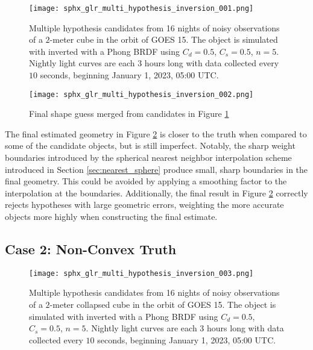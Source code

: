 \begin{figure}[!htb]
    \centering
    \texttt{[image: sphx\_glr\_multi\_hypothesis\_inversion\_001.png]}
    \caption{Multiple hypothesis candidates from 16 nights of noisy observations of a $2$-meter cube in the orbit of GOES 15. The object is simulated with inverted with a Phong BRDF using $C_d=0.5$, $C_s=0.5$, $n=5$. Nightly light curves are each $3$ hours long with data collected every $10$ seconds, beginning January 1, 2023, 05:00 UTC.}
    \label{fig:multi_hyp_candidates_cvx}
\end{figure}

\begin{figure}[!htb]
  \centering
  \texttt{[image: sphx\_glr\_multi\_hypothesis\_inversion\_002.png]}
  \caption{Final shape guess merged from candidates in Figure \ref{fig:multi_hyp_candidates_cvx}}
  \label{fig:multi_hyp_final_cvx}
\end{figure}

The final estimated geometry in Figure \ref{fig:multi_hyp_final_cvx} is closer to the truth when compared to some of the candidate objects, but is still imperfect. Notably, the sharp weight boundaries introduced by the spherical nearest neighbor interpolation scheme introduced in Section \ref{sec:nearest_sphere} produce small, sharp boundaries in the final geometry. This could be avoided by applying a smoothing factor to the interpolation at the boundaries. Additionally, the final result in Figure \ref{fig:multi_hyp_final_cvx} correctly rejects hypotheses with large geometric errors, weighting the more accurate objects more highly when constructing the final estimate.

\subsection{Case 2: Non-Convex Truth}

\begin{figure}[!htb]
  \centering
  \texttt{[image: sphx\_glr\_multi\_hypothesis\_inversion\_003.png]}
  \caption{Multiple hypothesis candidates from 16 nights of noisy observations of a $2$-meter collapsed cube in the orbit of GOES 15. The object is simulated with inverted with a Phong BRDF using $C_d=0.5$, $C_s=0.5$, $n=5$. Nightly light curves are each $3$ hours long with data collected every $10$ seconds, beginning January 1, 2023, 05:00 UTC.}
  \label{fig:multi_hyp_candidates_ncvx}
\end{figure}

